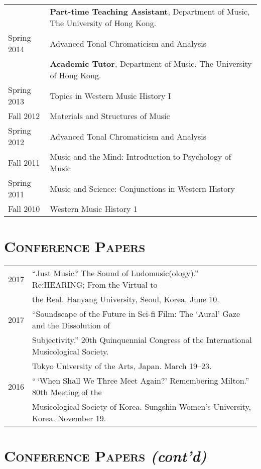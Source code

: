 \documentclass[a4paper,11pt]{article}
\begin{document}
\begin{tabular}{p{2.5cm} l}
    & \textbf{Part-time Teaching Assistant}, Department of Music, The University of Hong Kong.\\
    Spring 2014 & Advanced Tonal Chromaticism and Analysis\\[2mm]
    
    & \textbf{Academic Tutor}, Department of Music, The University of Hong Kong.\\
    Spring 2013 & Topics in Western Music History I\\
    Fall 2012 & Materials and Structures of Music\\
    Spring 2012 & Advanced Tonal Chromaticism and Analysis\\
    Fall 2011 & Music and the Mind: Introduction to Psychology of Music\\
    Spring 2011 & Music and Science: Conjunctions in Western History\\
    Fall 2010 & Western Music History 1
  \end{tabular}
  
  \vspace{5.0mm}
  
  \section*{\textsc{Conference Papers}}
  
  \hspace*{-0.25cm}
  \begin{tabular}{p{2.5cm} p{12.5cm}}
  2017 & ``Just Music? The Sound of Ludomusic(ology).'' Re:HEARING; From the Virtual to\\
  & the Real. Hanyang University, Seoul, Korea. June 10.\\[2mm]
  
  2017 & ``Soundscape of the Future in Sci-fi Film: The ‘Aural’ Gaze and the Dissolution of\\
  & Subjectivity.'' 20th Quinquennial Congress of the International Musicological Society.\\
  & Tokyo University of the Arts, Japan. March 19--23.\\[2mm]
  
  2016 & ``\,`When Shall We Three Meet Again?' Remembering Milton.'' 80th Meeting of the\\
  & Musicological Society of Korea. Sungshin Women's University, Korea. November 19.
  \end{tabular}
  
  \section*{\textsc{Conference Papers} \textit{(cont'd)}}
  
\end{document}
